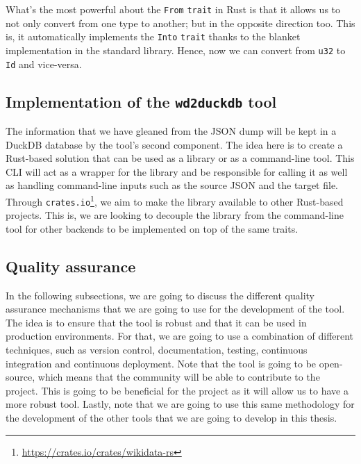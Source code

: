 \begin{code}
    \inputminted{rust}{code/listings/10-1_ids.rs}
\end{code}

What's the most powerful about the \texttt{From} \texttt{trait} in Rust is that it allows us to not only convert from one type to another; but in the opposite direction too. This is, it automatically implements the \texttt{Into} \texttt{trait} thanks to the blanket implementation in the standard library. Hence, now we can convert from \texttt{u32} to \texttt{Id} and vice-versa.

\subsection{Implementation of the \texttt{wd2duckdb} tool}

The information that we have gleaned from the JSON dump will be kept in a DuckDB database by the tool's second component. The idea here is to create a Rust-based solution that can be used as a library or as a command-line tool. This CLI will act as a wrapper for the library and be responsible for calling it as well as handling command-line inputs such as the source JSON and the target file. Through \texttt{crates.io}\footnote{\url{https://crates.io/crates/wikidata-rs}}, we aim to make the library available to other Rust-based projects. This is, we are looking to decouple the library from the command-line tool for other backends to be implemented on top of the same traits.

\subsection{Quality assurance}

In the following subsections, we are going to discuss the different quality assurance mechanisms that we are going to use for the development of the tool. The idea is to ensure that the tool is robust and that it can be used in production environments. For that, we are going to use a combination of different techniques, such as version control, documentation, testing, continuous integration and continuous deployment. Note that the tool is going to be open-source, which means that the community will be able to contribute to the project. This is going to be beneficial for the project as it will allow us to have a more robust tool. Lastly, note that we are going to use this same methodology for the development of the other tools that we are going to develop in this thesis.

